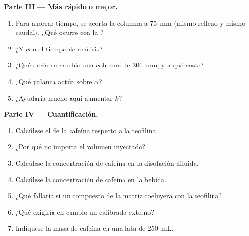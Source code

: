 \begin{problem}
\medskip
\noindent\textbf{Parte III --- Más rápido o mejor.}
\begin{enumerate}[resume]
  \item Para ahorrar tiempo, se acorta la columna a \qty{75}{mm} (mismo relleno y mismo caudal). ¿Qué ocurre con
        la ?
  \item ¿Y con el tiempo de análisis?
  \item ¿Qué daría en cambio una columna de \qty{300}{mm}, y a qué coste?
  \item ¿Qué palanca actúa sobre $\alpha$?
  \item ¿Ayudaría mucho aquí aumentar $k$?
\end{enumerate}

\medskip
\noindent\textbf{Parte IV --- Cuantificación.}
\begin{enumerate}[resume]
  \item Calcúlese el  de la cafeína respecto a la teofilina.
  \item ¿Por qué no importa el volumen inyectado?
  \item Calcúlese la concentración de cafeína en la disolución diluida.
  \item Calcúlese la concentración de cafeína en la bebida.
  \item ¿Qué fallaría si un compuesto de la matriz coeluyera con la teofilina?
  \item ¿Qué exigiría en cambio un calibrado externo?
  \item Indíquese la masa de cafeína en una lata de \qty{250}{mL}.
\end{enumerate}
\end{problem}

